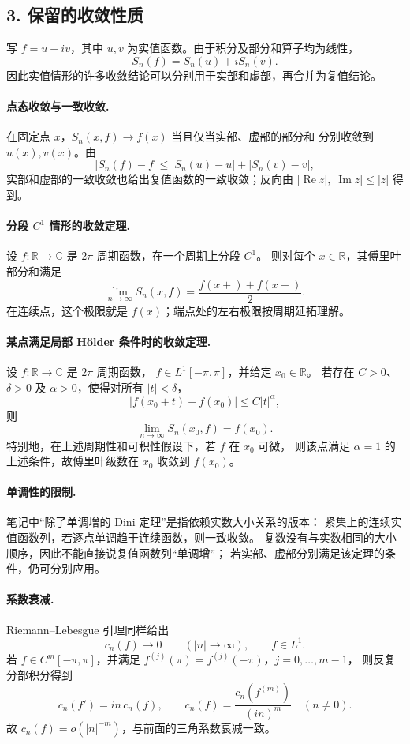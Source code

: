 \documentclass[11pt,a4paper]{ctexart}
\begin{document}
\subsection*{3. 保留的收敛性质}
写 $f=u+iv$，其中 $u,v$ 为实值函数。由于积分及部分和算子均为线性，
\[
 S_n(f)=S_n(u)+iS_n(v).
\]
因此实值情形的许多收敛结论可以分别用于实部和虚部，再合并为复值结论。

\paragraph{点态收敛与一致收敛.}
在固定点 $x$，$S_n(x,f)\to f(x)$ 当且仅当实部、虚部的部分和
分别收敛到 $u(x),v(x)$。由
\[
 |S_n(f)-f|\leq|S_n(u)-u|+|S_n(v)-v|,
\]
实部和虚部的一致收敛也给出复值函数的一致收敛；反向由
$|\operatorname{Re}z|,|\operatorname{Im}z|\leq|z|$ 得到。

\paragraph{分段 $C^1$ 情形的收敛定理.}
设 $f:\mathbb R\to\mathbb C$ 是 $2\pi$ 周期函数，在一个周期上分段 $C^1$。
则对每个 $x\in\mathbb R$，其傅里叶部分和满足
\[
 \lim_{n\to\infty}S_n(x,f)=\frac{f(x+)+f(x-)}{2}.
\]
在连续点，这个极限就是 $f(x)$；端点处的左右极限按周期延拓理解。

\paragraph{某点满足局部 H\"older 条件时的收敛定理.}
设 $f:\mathbb R\to\mathbb C$ 是 $2\pi$ 周期函数，
$f\in L^1[-\pi,\pi]$，并给定 $x_0\in\mathbb R$。
若存在 $C>0$、$\delta>0$ 及 $\alpha>0$，使得对所有 $|t|<\delta$，
\[
 |f(x_0+t)-f(x_0)|\leq C|t|^\alpha,
\]
则
\[
 \lim_{n\to\infty}S_n(x_0,f)=f(x_0).
\]
特别地，在上述周期性和可积性假设下，若 $f$ 在 $x_0$ 可微，
则该点满足 $\alpha=1$ 的上述条件，故傅里叶级数在 $x_0$ 收敛到 $f(x_0)$。

\paragraph{单调性的限制.}
笔记中“除了单调增的 Dini 定理”是指依赖实数大小关系的版本：
紧集上的连续实值函数列，若逐点单调趋于连续函数，则一致收敛。
复数没有与实数相同的大小顺序，因此不能直接说复值函数列“单调增”；
若实部、虚部分别满足该定理的条件，仍可分别应用。

\paragraph{系数衰减.}
Riemann--Lebesgue 引理同样给出
\[
 c_n(f)\longrightarrow0\qquad(|n|\to\infty),\qquad f\in L^1.
\]
若 $f\in C^m[-\pi,\pi]$，并满足
$f^{(j)}(\pi)=f^{(j)}(-\pi)$，$j=0,\ldots,m-1$，
则反复分部积分得到
\[
 c_n(f')=in\,c_n(f),\qquad
 c_n(f)=\frac{c_n(f^{(m)})}{(in)^m}\quad(n\ne0).
\]
故 $c_n(f)=o(|n|^{-m})$，与前面的三角系数衰减一致。
\end{document}
